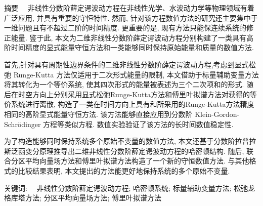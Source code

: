 
\begin{ChineseAbstract}[副教授]%
\item {\heiti 摘要\ \ }
非线性分数阶薛定谔波动方程在非线性光学、水波动力学等物理领域有着广泛应用, 并具有重要的守恒特性. 然而, 针对该方程数值方法的研究还主要集中于一维问题且有不超过二阶的时间精度. 更重要的是, 现有方法只能保连续系统的修正能量. 鉴于此, 本文为二维非线性分数阶薛定谔波动方程分别构建了一类具有高阶时间精度的显式能量守恒方法和一类能够同时保持原始能量和质量的数值方法.  

首先,针对具有周期性边界条件的二维非线性分数阶薛定谔波动方程,考虑到显式松弛 Runge-Kutta 方法仅适用于二次形式能量的限制, 本文借助于标量辅助变量方法将其转化为一个等价系统, 使其四次形式的能量被表述为三个二次项和的形式. 随后在时空方向上分别采用显式松弛Runge-Kutta方法和傅里叶拟谱方法对获得的等价系统进行离散, 构造了一类在时间方向上具有和所采用的Runge-Kutta方法精度相同的高阶显式能量守恒方法. 该方法能够直接应用到分数阶 Klein-Gordon-Schr{\"o}dinger 方程等类似方程. 数值实验验证了该方法的长时间数值稳定性.

为了构造能够同时保持系统多个原始不变量的数值方法, 本文还基于分数阶拉普拉斯泛函变分原理推导出二维非线性分数阶薛定谔波动方程的哈密顿结构. 随后, 联合分区平均向量场方法和傅里叶拟谱方法构造了一个新的守恒数值方法. 与其他格式的比较结果表明, 本文提出的方法能更好地保持系统的多个原始不变量.


\item {\heiti 关键词:\ \ } 非线性分数阶薛定谔波动方程; 哈密顿系统; 标量辅助变量方法; 松弛龙格库塔方法; 分区平均向量场方法; 傅里叶拟谱方法
\end{ChineseAbstract}
